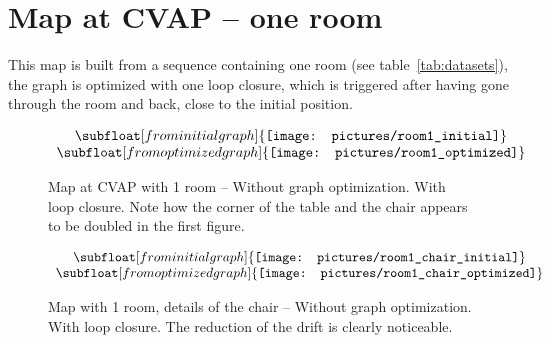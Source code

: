 %
%


\cleardoublepage
\section{Map at CVAP -- one room}

This map is built from a sequence containing one room (see table~\ref{tab:datasets}), the graph is optimized with one loop closure, which is triggered after having gone through the room and back, close to the initial position. 

\begin{figure}[H]
\centering$
\begin{array}{c}
\subfloat[from initial graph]{\label{fig:room1_1}\texttt{[image: pictures/room1\_initial]}} \\
\subfloat[from optimized graph]{\label{fig:room1_2}\texttt{[image: pictures/room1\_optimized]}}
\end{array}$
\caption{Map at CVAP with 1 room -- \protect{} Without graph optimization. \protect{} With loop closure. Note how the corner of the table and the chair appears to be doubled in the first figure.}
\end{figure}

\begin{figure}[H]
\centering$
\begin{array}{c}
\subfloat[from initial graph]{\label{fig:room1_chair_1}\texttt{[image: pictures/room1\_chair\_initial]}} \\
\subfloat[from optimized graph]{\label{fig:room1_chair_2}\texttt{[image: pictures/room1\_chair\_optimized]}}
\end{array}$
\caption{Map with 1 room, details of the chair -- \protect{} Without graph optimization. \protect{} With loop closure. The reduction of the drift is clearly noticeable.}
\end{figure}

